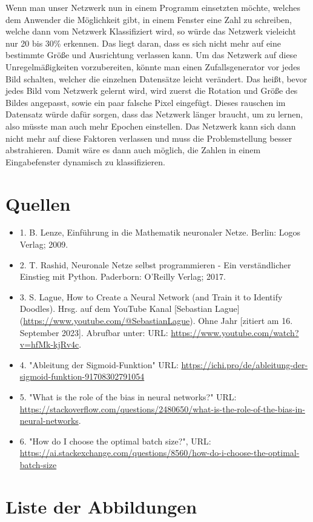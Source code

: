 \documentclass[12pt]{article}
\begin{document}
Wenn man unser Netzwerk nun in einem Programm einsetzten möchte, welches dem Anwender die Möglichkeit gibt, in einem Fenster eine Zahl zu schreiben, welche dann vom Netzwerk Klassifiziert wird, so würde das Netzwerk vieleicht nur 20 bis 30\% erkennen. Das liegt daran, dass es sich nicht mehr auf eine bestimmte Größe und Ausrichtung verlassen kann. Um das Netzwerk auf diese Unregelmäßigkeiten vorzubereiten, könnte man einen Zufallsgenerator vor jedes Bild schalten, welcher die einzelnen Datensätze leicht verändert. Das heißt, bevor jedes Bild vom Netzwerk gelernt wird, wird zuerst die Rotation und Größe des Bildes angepasst, sowie ein paar falsche Pixel eingefügt. Dieses rauschen im Datensatz würde dafür sorgen, dass das Netzwerk länger braucht, um zu lernen, also müsste man auch mehr Epochen einstellen. Das Netzwerk kann sich dann nicht mehr auf diese Faktoren verlassen und muss die Problemstellung besser abstrahieren. Damit wäre es dann auch möglich, die Zahlen in einem Eingabefenster dynamisch zu klassifizieren.\\


\cleardoublepage
\sloppy
\section{Quellen}
\begin{itemize}
\item 1. B. Lenze, Einführung in die Mathematik neuronaler Netze. Berlin: Logos Verlag; 2009.
\item 2. T. Rashid, Neuronale Netze selbst programmieren - Ein verständlicher Einstieg mit Python. Paderborn: O’Reilly Verlag; 2017.
\item 3. S. Lague, How to Create a Neural Network (and Train it to Identify Doodles). Hrsg. auf dem YouTube Kanal [Sebastian Lague](\url{https://www.youtube.com/@SebastianLague}). Ohne Jahr [zitiert am 16. September 2023]. Abrufbar unter: URL: \url{https://www.youtube.com/watch?v=hfMk-kjRv4c}.
\item 4. "Ableitung der Sigmoid-Funktion" URL: \url{https://ichi.pro/de/ableitung-der-sigmoid-funktion-91708302791054}
\item 5. "What is the role of the bias in neural networks?" URL: \url{https://stackoverflow.com/questions/2480650/what-is-the-role-of-the-bias-in-neural-networks}.
\item 6. "How do I choose the optimal batch size?", URL: \url{https://ai.stackexchange.com/questions/8560/how-do-i-choose-the-optimal-batch-size}
\end{itemize}

\cleardoublepage
\section{Liste der Abbildungen}
\listoffigures
\end{document}
